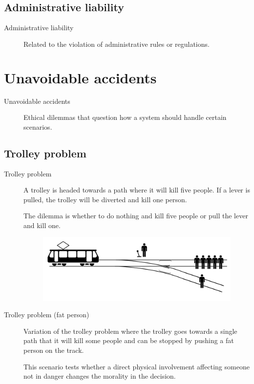 \subsection{Administrative liability}

\begin{description}
    \item[Administrative liability] 
        Related to the violation of administrative rules or regulations.
\end{description}



\section{Unavoidable accidents}

\begin{description}
    \item[Unavoidable accidents]
        Ethical dilemmas that question how a system should handle certain scenarios.
\end{description}


\subsection{Trolley problem}

\begin{description}
    \item[Trolley problem] 
        A trolley is headed towards a path where it will kill five people. If a lever is pulled, the trolley will be diverted and kill one person.

        The dilemma is whether to do nothing and kill five people or pull the lever and kill one.

        \begin{figure}[H]
            \centering
            \includegraphics[width=0.5\linewidth]{./img/trolley_problem.png}
        \end{figure}

    \item[Trolley problem (fat person)] 
        Variation of the trolley problem where the trolley goes towards a single path that it will kill some people and can be stopped by pushing a fat person on the track.

        This scenario tests whether a direct physical involvement affecting someone not in danger changes the morality in the decision.
\end{description}


